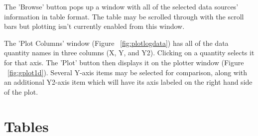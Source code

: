 \begin{figure}
\begin{flushleft}
\end{flushleft}
\end{figure}

\begin{figure}
\begin{flushleft}
\end{flushleft}
\end{figure}

The 'Browse' button pops up a window with all of the selected data sources'
information in table format. The table may be scrolled through with the
scroll bars but plotting isn't currently enabled from this window.

The 'Plot Columns' window (Figure ~\ref{fig:plotlogdata}) has all of the
data quantity names in three columns (X, Y, and Y2). Clicking on 
a quantity selects it for that axis. The 'Plot' button then displays
it on the plotter window (Figure ~\ref{fig:gplot1d}). Several Y-axis
items may be selected for comparison, along with an additional Y2-axis
item which will have its axis labeled on the right hand side of the
plot.

\begin{figure}
\begin{flushleft}
\end{flushleft}
\end{figure}

\begin{figure}
\begin{flushleft}
\end{flushleft}
\end{figure}

\begin{figure}
\begin{flushleft}
\end{flushleft}
\end{figure}

%
%
\section{Tables}


